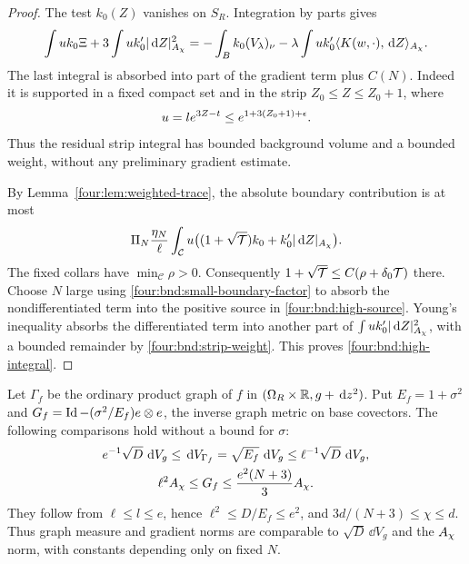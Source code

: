\begin{proof}
The test $k_0(Z)$ vanishes on $S_R$.  Integration by parts gives
\begin{align*}
 \int u k_0\Xi+3\int u k_0'|\,\mathrm d Z|_{A_\chi}^2
 =-\int_B k_0(V_\lambda)_\nu
  -\lambda\int u k_0'
       \langle K(w,\cdot),\,\mathrm d Z\rangle_{A_\chi}.
\end{align*}
The last integral is absorbed into part of the gradient term plus
$C(N)$.  Indeed it is supported in a fixed compact set and in the
strip $Z_0\le Z\le Z_0+1$, where
\begin{equation}\label{four:bnd:strip-weight}
 u=l e^{3Z-t}\le e^{1+3(Z_0+1)+\epsilon}.
\end{equation}
Thus the residual strip integral has bounded background volume
and a bounded weight, without any preliminary gradient estimate.

By Lemma~\ref{four:lem:weighted-trace}, the absolute boundary contribution
is at most
\[
 \Pi_N\frac{\eta_N}{\ell}
 \int_{\mathcal C}u
 \bigl((1+\sqrt{\mathcal T})k_0+k_0'|\,\mathrm d Z|_{A_\chi}\bigr).
\]
The fixed collars have $\min_{\mathcal C}\rho>0$.  Consequently
$1+\sqrt{\mathcal T}\le C(\rho+\delta_0\mathcal T)$ there.
Choose $N$ large using \eqref{four:bnd:small-boundary-factor} to absorb
the nondifferentiated term into the positive source in
\eqref{four:bnd:high-source}.  Young's inequality absorbs the differentiated
term into another part of $\int u k_0'|\,\mathrm d Z|_{A_\chi}^2$, with
a bounded remainder by \eqref{four:bnd:strip-weight}.  This proves
\eqref{four:bnd:high-integral}.
\end{proof}

Let $\Gamma_f$ be the ordinary product graph of $f$ in
$(\Omega_R\times\mathbb R,g+\,\mathrm d z^2)$.  Put $E_f=1+\sigma^2$ and
$G_f=\operatorname{Id}-(\sigma^2/E_f)e\otimes e$, the inverse graph metric
on base covectors.  The following comparisons hold without a
bound for $\sigma$:
\begin{equation}\label{four:bnd:graph-comparison}
 \begin{gathered}
 e^{-1}\sqrt D\,\,\mathrm d V_g\le\,\mathrm d V_{\Gamma_f}
       =\sqrt{E_f}\,\,\mathrm d V_g\le\ell^{-1}\sqrt D\,\,\mathrm d V_g,\\
 \ell^2A_\chi\le G_f\le\frac{e^2(N+3)}3A_\chi.
 \end{gathered}
\end{equation}
They follow from $\ell\le l\le e$, hence
$\ell^2\le D/E_f\le e^2$, and
$3d/(N+3)\le\chi\le d$.  Thus graph measure and gradient norms
are comparable to $\sqrt D\,\dd V_g$ and the $A_\chi$ norm,
with constants depending only on fixed $N$.

